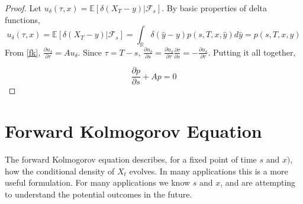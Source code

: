 \documentclass{article}
\theoremstyle{definition}
\begin{document}
\begin{proof}
	Let \(u_\delta (\tau, x)= \mathbb{E}\left[\delta(X_T-y)  | \mathcal{F}_s\right]\).
	By basic properties of delta functions, 
	\[u_\delta(\tau, x)=\mathbb{E}\left[\delta(X_T-y) | \mathcal{F}_s \right]=\int_\mathbb{R} \delta(\hat{y}-y) p(s, T, x, \hat{y}) d\hat{y}=p(s, T, x, y)\]
	From \ref{fk}, \(\frac{\partial u_\delta}{\partial \tau}=Au_\delta\).  Since \(\tau=T-s\), \(\frac{\partial u_\delta}{\partial s} = \frac{\partial u_\delta}{\partial \tau} \frac{\partial \tau}{\partial s}=-\frac{\partial u_\delta}{\partial \tau} \).  Putting it all together, 
	
	\[\frac{\partial p}{\partial s} + Ap=0 \]
	
\end{proof}

\section{Forward Kolmogorov Equation}

The forward Kolmogorov equation describes, for a fixed point of time \(s\) and \(x)\), how the conditional density of \(X_t\) evolves.  In many applications this is a more useful formulation.  For many applications we know \(s\) and \(x\), and are attempting to understand the potential outcomes in the future.  
\end{document}
